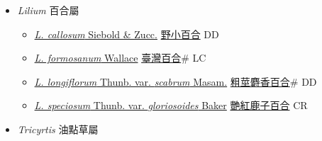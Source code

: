 
  \begin{itemize}
 \item[] \textit{Lilium} 百合屬
                    
  \begin{itemize}
        \item[] \href{http://www.theplantlist.org/tpl1.1/search?q=Lilium+callosum}{\textit{L. callosum} Siebold \& Zucc.}     \href{\detokenize{http://taibnet.sinica.edu.tw/chi/taibnet_species_list.php?T2=野小百合&T2_new_value=true&fr=y}}{野小百合} DD
        \item[] \href{http://www.theplantlist.org/tpl1.1/search?q=Lilium+formosanum}{\textit{L. formosanum} Wallace}   \href{\detokenize{http://taibnet.sinica.edu.tw/chi/taibnet_species_list.php?T2=臺灣百合&T2_new_value=true&fr=y}}{臺灣百合}\# LC
        \item[] \href{http://www.theplantlist.org/tpl1.1/search?q=Lilium+longiflorum+var.+scabrum}{\textit{L. longiflorum} Thunb. var. \textit{scabrum} Masam.}   \href{\detokenize{http://taibnet.sinica.edu.tw/chi/taibnet_species_list.php?T2=粗莖麝香百合&T2_new_value=true&fr=y}}{粗莖麝香百合}\# DD
        \item[] \href{http://www.theplantlist.org/tpl1.1/search?q=Lilium+speciosum+var.+gloriosoides}{\textit{L. speciosum} Thunb. var. \textit{gloriosoides} Baker}   \href{\detokenize{http://taibnet.sinica.edu.tw/chi/taibnet_species_list.php?T2=艷紅鹿子百合&T2_new_value=true&fr=y}}{艷紅鹿子百合} CR
  \end{itemize}
 \item[] \textit{Tricyrtis} 油點草屬
                    

\end{itemize}
